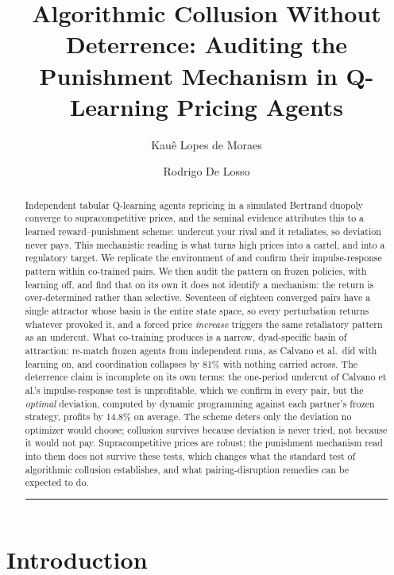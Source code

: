 \documentclass[sigconf]{acmart}
\title{Algorithmic Collusion Without Deterrence: Auditing the Punishment Mechanism in Q-Learning Pricing Agents}
\author{Kau\^{e} Lopes de Moraes}
\affiliation{%
  \institution{University of S\~{a}o Paulo}
  \city{S\~{a}o Paulo}
  \country{Brazil}}
\author{Rodrigo De Losso}
\affiliation{%
  \institution{University of S\~{a}o Paulo}
  \city{S\~{a}o Paulo}
  \country{Brazil}}
\begin{document}
\begin{abstract}
Independent tabular Q-learning agents repricing in a simulated Bertrand
duopoly converge to supracompetitive prices, and the seminal evidence
attributes this to a learned reward--punishment scheme: undercut your
rival and it retaliates, so deviation never pays. This mechanistic
reading is what turns high prices into a cartel, and into a regulatory
target. We replicate the environment of \citet{calvano2020} and confirm
their impulse-response pattern within co-trained pairs. We then audit
the pattern on frozen policies, with learning off, and find that on its
own it does not identify a mechanism: the return is over-determined
rather than selective. Seventeen of eighteen converged pairs have a
single attractor whose basin is the entire state space, so every
perturbation returns whatever provoked it, and a forced price
\emph{increase} triggers the same retaliatory pattern as an undercut.
What co-training produces is a narrow, dyad-specific basin of
attraction: re-match frozen agents from independent runs, as Calvano et
al.~did with learning on, and coordination collapses by 81\% with
nothing carried across. The deterrence claim is incomplete on its own
terms: the one-period undercut of Calvano et al.'s impulse-response test
is unprofitable, which we confirm in every pair, but the \emph{optimal}
deviation, computed by dynamic programming against each partner's frozen
strategy, profits by 14.8\% on average. The scheme deters only the
deviation no optimizer would choose; collusion survives because
deviation is never tried, not because it would not pay. Supracompetitive
prices are robust; the punishment mechanism read into them does not
survive these tests, which changes what the standard test of algorithmic
collusion establishes, and what pairing-disruption remedies can be
expected to do.

\begin{center}\rule{0.5\linewidth}{0.5pt}\end{center}
\end{abstract}


\maketitle

\section{Introduction}\label{introduction}
\end{document}
